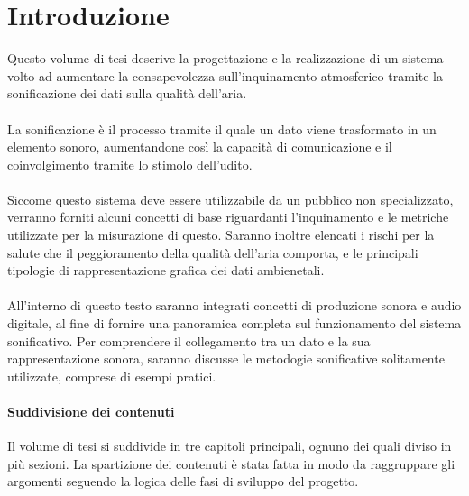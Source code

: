 %
\chapter*{Introduzione}                 %
Questo volume di tesi descrive la progettazione e la realizzazione di un sistema volto ad aumentare la consapevolezza sull'inquinamento atmosferico tramite la sonificazione dei dati sulla qualità dell'aria.
\\\\
La sonificazione è il processo tramite il quale un dato viene trasformato in un elemento sonoro, aumentandone così la capacità di comunicazione e il coinvolgimento tramite lo stimolo dell'udito.
\\\\
Siccome questo sistema deve essere utilizzabile da un pubblico non specializzato, verranno forniti alcuni concetti di base riguardanti l'inquinamento e le metriche utilizzate per la misurazione di questo.
Saranno inoltre elencati i rischi per la salute che il peggioramento della qualità dell'aria comporta, e le principali tipologie di rappresentazione grafica dei dati ambienetali.
\\\\
All'interno di questo testo saranno integrati concetti di produzione sonora e audio digitale, al fine di fornire una panoramica completa sul funzionamento del sistema sonificativo.
Per comprendere il collegamento tra un dato e la sua rappresentazione sonora, saranno discusse le metodogie sonificative solitamente utilizzate, comprese di esempi pratici.

\newpage

\subsubsection{Suddivisione dei contenuti}
Il volume di tesi si suddivide in tre capitoli principali, ognuno dei quali diviso in più sezioni.
La spartizione dei contenuti è stata fatta in modo da raggruppare gli argomenti seguendo la logica delle fasi di sviluppo del progetto.

